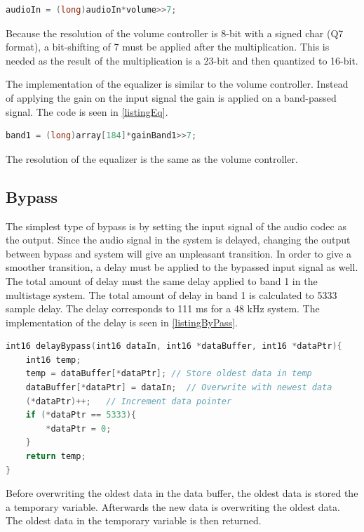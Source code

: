 \begin{lstlisting}[language=C, caption = {Gain adjustment in DSP},label={listingVolume}]
audioIn = (long)audioIn*volume>>7;
\end{lstlisting}

Because the resolution of the volume controller is 8-bit with a signed char (Q7 format), a bit-shifting of 7 must be applied after the multiplication. This is needed as the result of the multiplication is a 23-bit and then quantized to 16-bit.

The implementation of the equalizer is similar to the volume controller. Instead of applying the gain on the input signal the gain is applied on a band-passed signal. The code is seen in \autoref{listingEq}.

\begin{lstlisting}[language=C, caption = {Gain adjustment in DSP},label={listingEq}]
band1 = (long)array[184]*gainBand1>>7;
\end{lstlisting}

The resolution of the equalizer is the same as the volume controller. 

\subsection*{Bypass}
The simplest type of bypass is by setting the input signal of the audio codec as the output. Since the audio signal in the system is delayed, changing the output between bypass and system will give an unpleasant transition. In order to give a smoother transition, a delay must be applied to the bypassed input signal as well. The total amount of delay must the same delay applied to band 1 in the multistage system. The total amount of delay in band 1 is calculated to 5333 sample delay. The delay corresponds to 111 ms for a 48 kHz system. The implementation of the delay is seen in \autoref{listingByPass}.

\begin{lstlisting}[language=C, caption = {Delay function for bypass},label={listingByPass}]
int16 delayBypass(int16 dataIn, int16 *dataBuffer, int16 *dataPtr){
	int16 temp;
	temp = dataBuffer[*dataPtr]; // Store oldest data in temp
	dataBuffer[*dataPtr] = dataIn;	// Overwrite with newest data
	(*dataPtr)++;	// Increment data pointer
	if (*dataPtr == 5333){	
		*dataPtr = 0;	
	}
	return temp;
}
\end{lstlisting}

Before overwriting the oldest data in the data buffer, the oldest data is stored the a temporary variable. Afterwards the new data is overwriting the oldest data. The oldest data in the temporary variable is then returned.

